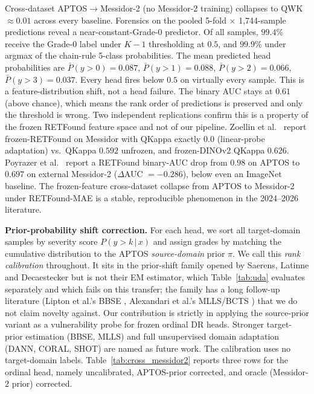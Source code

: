 \documentclass[journal]{IEEEtran}
\begin{document}
Cross-dataset APTOS$\to$Messidor-2 (no Messidor-2 training) collapses to QWK $\approx 0.01$ across every baseline. Forensics on the pooled 5-fold $\times$ 1,744-sample predictions reveal a near-constant-Grade-0 predictor. Of all samples, $99.4\%$ receive the Grade-0 label under $K{-}1$ thresholding at $0.5$, and $99.9\%$ under argmax of the chain-rule 5-class probabilities. The mean predicted head probabilities are $\bar{P}(y{>}0) = 0.087$, $\bar{P}(y{>}1) = 0.088$, $\bar{P}(y{>}2) = 0.066$, $\bar{P}(y{>}3) = 0.037$. Every head fires below $0.5$ on virtually every sample. This is a feature-distribution shift, not a head failure. The binary AUC stays at $0.61$ (above chance), which means the rank order of predictions is preserved and only the threshold is wrong. Two independent replications confirm this is a property of the frozen RETFound feature space and not of our pipeline. Zoellin et al.\ \cite{ref:zoellin} report frozen-RETFound on Messidor with QKappa exactly $0.0$ (linear-probe adaptation) vs.\ QKappa $0.592$ unfrozen, and frozen-DINOv2 QKappa $0.626$. Poyrazer et al.\ \cite{ref:dinov2_vs_retfound} report a RETFound binary-AUC drop from $0.98$ on APTOS to $0.697$ on external Messidor-2 ($\Delta$AUC $= -0.286$), below even an ImageNet baseline. The frozen-feature cross-dataset collapse from APTOS to Messidor-2 under RETFound-MAE is a stable, reproducible phenomenon in the 2024--2026 literature.

\textbf{Prior-probability shift correction.} For each head, we sort all target-domain samples by severity score $P(y{>}k\,|\,x)$ and assign grades by matching the cumulative distribution to the APTOS \emph{source-domain} prior $\pi$. We call this \emph{rank calibration} throughout. It sits in the prior-shift family opened by Saerens, Latinne and Decaestecker \cite{ref:saerens} but is not their EM estimator, which Table~\ref{tab:uda} evaluates separately and which fails on this transfer; the family has a long follow-up literature (Lipton et al.'s BBSE \cite{ref:bbse}, Alexandari et al.'s MLLS/BCTS \cite{ref:mlls}) that we do not claim novelty against. Our contribution is strictly in applying the source-prior variant as a vulnerability probe for frozen ordinal DR heads. Stronger target-prior estimation (BBSE, MLLS) and full unsupervised domain adaptation (DANN, CORAL, SHOT) are named as future work. The calibration uses no target-domain labels. Table~\ref{tab:cross_messidor2} reports three rows for the ordinal head, namely uncalibrated, APTOS-prior corrected, and oracle (Messidor-2 prior) corrected.
\end{document}
